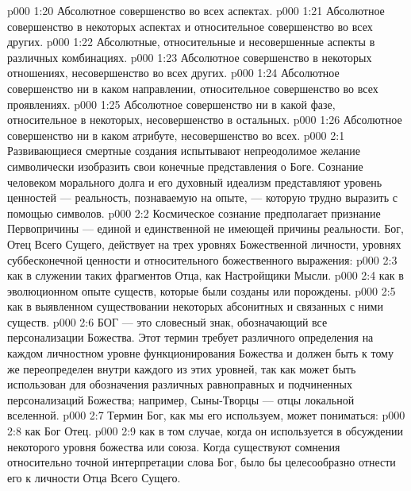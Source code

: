\vs p000 1:20 \bibnobreakspace Абсолютное совершенство во всех аспектах.
\vs p000 1:21 \bibnobreakspace Абсолютное совершенство в некоторых аспектах и относительное совершенство во всех других.
\vs p000 1:22 \bibnobreakspace Абсолютные, относительные и несовершенные аспекты в различных комбинациях.
\vs p000 1:23 \bibnobreakspace Абсолютное совершенство в некоторых отношениях, несовершенство во всех других.
\vs p000 1:24 \bibnobreakspace Абсолютное совершенство ни в каком направлении, относительное совершенство во всех проявлениях.
\vs p000 1:25 \bibnobreakspace Абсолютное совершенство ни в какой фазе, относительное в некоторых, несовершенство в остальных.
\vs p000 1:26 \bibnobreakspace Абсолютное совершенство ни в каком атрибуте, несовершенство во всех.
\vs p000 2:1 Развивающиеся смертные создания испытывают непреодолимое желание символически изобразить свои конечные представления о Боге. Сознание человеком морального долга и его духовный идеализм представляют уровень ценностей --- реальность, познаваемую на опыте, --- которую трудно выразить с помощью символов.
\vs p000 2:2 Космическое сознание предполагает признание Первопричины --- единой и единственной не имеющей причины реальности. Бог, Отец Всего Сущего, действует на трех уровнях Божественной личности, уровнях суббесконечной ценности и относительного божественного выражения:
\vs p000 2:3 \bibnobreakspace {} как в служении таких фрагментов Отца, как Настройщики Мысли.
\vs p000 2:4 \bibnobreakspace {} как в эволюционном опыте существ, которые были созданы или порождены.
\vs p000 2:5 \bibnobreakspace {} как в выявленном существовании некоторых абсонитных и связанных с ними существ.
\vs p000 2:6 БОГ --- это словесный знак, обозначающий все персонализации Божества. Этот термин требует различного определения на каждом личностном уровне функционирования Божества и должен быть к тому же переопределен внутри каждого из этих уровней, так как может быть использован для обозначения различных равноправных и подчиненных персонализаций Божества; например, Сыны\hyp{}Творцы --- отцы локальной вселенной.
\vs p000 2:7 \pc Термин Бог, как мы его используем, может пониматься:
\vs p000 2:8  как Бог Отец.
\vs p000 2:9  как в том случае, когда он используется в обсуждении некоторого уровня божества или союза. Когда существуют сомнения относительно точной интерпретации слова Бог, было бы целесообразно отнести его к личности Отца Всего Сущего.
